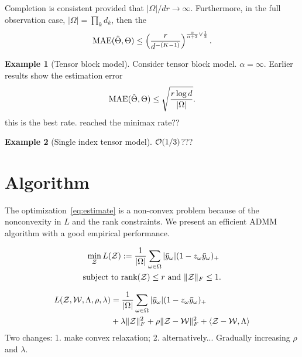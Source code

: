 \documentclass{article}
\theoremstyle{plain}
\newtheorem{thm}{Theorem}[section]
\theoremstyle{definition}
\newtheorem{example}{Example}
\def\rank{\textup{rank}}
\def\caliP{\mathscr{P}_{\textup{sgn}}}
\begin{document}
Completion is consistent provided that $|\Omega|/dr\to\infty$. Furthermore, in the full observation case, $|\Omega|=\prod_k d_k$, then the 
\[
\textup{MAE}(\hat \Theta, \Theta)\leq \left(r\over d^{-(K-1)}\right)^{{\alpha \over \alpha+2} \vee {1\over 2}}.
\]

\begin{example}[Tensor block model]
Consider tensor block model. $\alpha=\infty$. Earlier results show the estimation error
\[
\textup{MAE}(\hat \Theta, \Theta)\leq \sqrt{r\log d \over |\Omega|}.
\]
this is the best rate. reached the minimax rate??
\end{example}
\begin{example}[Single index tensor model]
$\mathcal{O}(1/3)$???
\end{example}

\section{Algorithm}
The optimization~\eqref{eq:estimate} is a non-convex problem because of the nonconvexity in $L$ and the rank constraints. We present an efficient ADMM algorithm with a good empirical performance. 

\begin{align}
\min_{\tZ}L(\tZ)&:={1\over |\Omega|}\sum_{\omega \in \Omega}|\bar y_\omega| (1-z_\omega\bar y_\omega)_{+}\\
\text{subject to }&\rank(\tZ)\leq r \ \text{and }\FnormSize{}{\tZ}\leq 1.
\end{align}

\begin{align}
L(\mathcal{Z},\mathcal{W},\Lambda,\rho,\lambda)&={1\over |\Omega|}\sum_{\omega \in \Omega}|\bar y_\omega| (1-z_\omega\bar y_\omega)_{+}\\
&+\lambda\lVert\mathcal{Z}\rVert_F^2+
\rho \lVert\mathcal{Z}-\mathcal{W}\rVert_F^2 + \langle \mathcal{Z}-\mathcal{W},\Lambda \rangle
\end{align}
Two changes: 1. make convex relaxation; 2. alternatively... Gradually increasing $\rho$ and $\lambda$.
\end{document}
